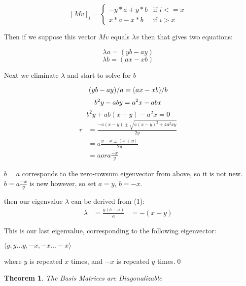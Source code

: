 \documentclass[10pt,a4paper]{report}
\newtheorem{theorem}{Theorem}
\begin{document}
\[ {[Mv]}_i = \begin{cases}
	-y*a + y*b & \text{if } i <= x\\
	x*a - x*b & \text{if } i > x
\end{cases} \]

Then if we suppose this vector $Mv$ equals $\lambda v$ then that gives two
equations:

\begin{equation}
	\lambda a = (yb - ay)
\end{equation}
\begin{equation*}
	\lambda b = (ax - xb)
\end{equation*}

\pagebreak

Next we eliminate $\lambda$ and start to solve for $b$

\begin{equation*}
	(yb - ay)/a = (ax - xb)/b\\
\end{equation*}
\begin{equation*}
	b^2y - aby = a^2x - abx\\
\end{equation*}
\begin{equation*}
	b^2y + ab(x - y) - a^2x = 0
\end{equation*}
\begin{align*}
	r &= \frac{-a(x-y) \pm \sqrt{{a(x-y)}^2 + 4a^2xy}}{2y}\\
	  &= a\frac{y - x \pm (x + y)}{2y}\\
	  &= a or a\frac{-x}{y}
\end{align*}

$b = a$ corresponds to the zero-rowsum eigenvector from above, so it is not
new.
$b = a\frac{-x}{y}$ is new however, so set $a = y$, $b = -x$.

then our eigenvalue $\lambda$ can be derived from (1):
\begin{align*}
	\lambda &= \frac{y(b - a)}{a}
			&= -(x + y)
\end{align*}

This is our last eigenvalue, corresponding to the following eigenvector:

$\langle y, y\ldots y, -x, -x\ldots -x\rangle$

where $y$ is repeated $x$ times, and $-x$ is repeated $y$ times.\qed

\begin{theorem} The Basis Matrices are Diagonalizable \end{theorem}
\end{document}
